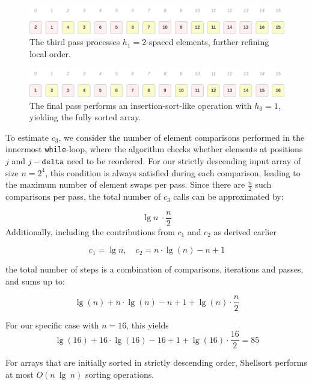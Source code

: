 \begin{figure}[!h]
    \centering
    \includegraphics[width=1\columnwidth]{img/bestcase-it3}
    \caption{The third pass processes $h_1 = 2$-spaced elements, further refining local order.}
    \label{fig:bestcase-it3}
\end{figure}

\begin{figure}[!h]
    \centering
    \includegraphics[width=1\columnwidth]{img/bestcase-it4}
    \caption{The final pass performs an insertion-sort-like operation with $h_0 = 1$, yielding the fully sorted array.}
    \label{fig:bestcase-it4}
\end{figure}

To estimate $c_3$, we consider the number of element comparisons performed in the innermost \texttt{while}-loop, where the algorithm checks whether elements at positions $j$ and $j - \texttt{delta}$ need to be reordered.
For our strictly descending input array of size $n = 2^4$, this condition is always satisfied during each comparison, leading to the maximum number of element swaps per pass.
Since there are $\frac{n}{2}$ such comparisons per pass, the total number of $c_3$ calls can be approximated by:

\[
    \lg n\ \cdot \frac{n}{2}
\]
\noindent
Additionally, including the contributions from $c_1$ and $c_2$ as derived earlier

\[
    c_1 = \lg n, \quad
    c_2 = n \cdot \lg(n) - n + 1
\]

\noindent
the total number of steps is a combination of comparisons, iterations and passes, and sums up to:

\[
    \lg(n) + n \cdot \lg(n) - n + 1 + \lg(n) \cdot \frac{n}{2}
\]

\noindent
For our specific case with $n = 16$, this yields
\[
    \lg(16) + 16 \cdot \lg(16) - 16 + 1 +  \lg(16) \cdot \frac{16}{2} = 85
\]

\begin{theorem}
    For arrays that are initially sorted in strictly descending order, Shellsort performs at most $O(n\ \lg\ n)$ sorting operations.
\end{theorem}


